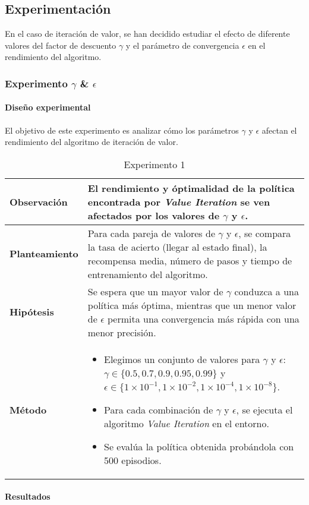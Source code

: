 \subsection{Experimentación}

En el caso de iteración de valor, se han decidido estudiar el efecto de diferente valores del factor de descuento $\gamma$ y el parámetro de convergencia $\epsilon$ en el rendimiento del algoritmo. 

\subsubsection{Experimento \(\gamma\) \& \(\epsilon\)} 

\paragraph{Diseño experimental}
El objetivo de este experimento es analizar cómo los parámetros \(\gamma\) y \(\epsilon\) afectan el rendimiento del algoritmo de iteración de valor.

\begin{table}[H]
    \centering
    \begin{tabularx}{\textwidth}{|p{4cm}|X|} %
        \hline %
        \textbf{Observación} & El rendimiento y óptimalidad de la política encontrada por \textit{Value Iteration} se ven afectados por los valores de $\gamma$ y $\epsilon$.
        \\ \hline
        \textbf{Planteamiento} & Para cada pareja de valores de $\gamma$ y $\epsilon$, se compara la tasa de acierto (llegar al estado final), la recompensa media, número de pasos y tiempo de entrenamiento del algoritmo.
        \\ \hline
        \textbf{Hipótesis} & Se espera que un mayor valor de $\gamma$ conduzca a una política más óptima, mientras que un menor valor de $\epsilon$ permita una convergencia más rápida con una menor precisión.
        \\ \hline
        \textbf{Método} & 
        \begin{itemize}
            \item Elegimos un conjunto de valores para $\gamma$ y $\epsilon$: \(\gamma \in \{0.5, 0.7, 0.9, 0.95, 0.99\}\) y \(\epsilon \in \{1\times 10^{-1}, 1\times 10^{-2}, 1\times 10^{-4}, 1\times 10^{-8}\}\).
            \item Para cada combinación de \(\gamma\) y \(\epsilon\), se ejecuta el algoritmo \textit{Value Iteration} en el entorno.
            \item Se evalúa la política obtenida probándola con 500 episodios.
        \end{itemize}
        \\ \hline
    \end{tabularx}
    \caption{Experimento 1}
    \label{tab:diseñoValueIterationExp1}
\end{table}

\paragraph{Resultados}